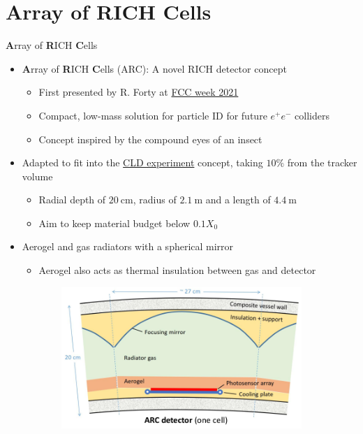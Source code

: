 \documentclass{beamer}
\begin{document}
\section{\textbf{A}rray of \textbf{R}ICH \textbf{C}ells}
\begin{frame}{\textbf{A}rray of \textbf{R}ICH \textbf{C}ells}
  \begin{itemize}
    \setlength\itemsep{0.2em}
    \item{\textbf{A}rray of \textbf{R}ICH \textbf{C}ells (ARC): A novel RICH detector concept}
    \begin{itemize}
      \item{First presented by R. Forty at \href{https://indico.cern.ch/event/995850/contributions/4406336/attachments/2274813/3864163/ARC-presentation.pdf}{FCC week 2021}}
      \item{Compact, low-mass solution for particle ID for future $e^+e^-$ colliders}
      \item{Concept inspired by the compound eyes of an insect}
    \end{itemize}
    \item{Adapted to fit into the \href{https://arxiv.org/abs/1911.12230}{CLD experiment} concept, taking $10\%$ from the tracker volume}
    \begin{itemize}
      \item{Radial depth of $\SI{20}{\centi\meter}$, radius of $\SI{2.1}{\meter}$ and a length of $\SI{4.4}{\meter}$}
      \item{Aim to keep material budget below $0.1X_0$}
    \end{itemize}
    \item{Aerogel and gas radiators with a spherical mirror}
    \begin{itemize}
      \item{Aerogel also acts as thermal insulation between gas and detector}
    \end{itemize}
  \end{itemize}
  \begin{figure}
    \centering
    \begin{subfigure}{0.4\textwidth}
      \includegraphics[width = 1.0\textwidth]{Plots/ARC_Cell.png}

\end{subfigure}
\end{figure}
\end{frame}
\end{document}
